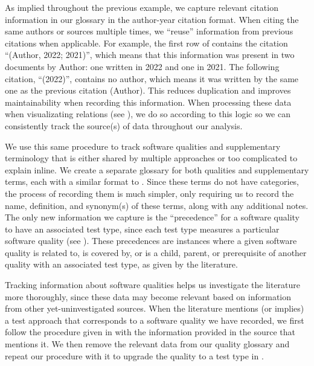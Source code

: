 \ifnotpaper
    \label{record-cites}
    As implied throughout the previous example, we capture relevant citation
    information in our glossary in the author-year citation format. When citing
    the same authors or sources multiple times, we ``reuse'' information from
    previous citations
    when applicable. For example, the first row of 
    contains the citation ``(Author, 2022; 2021)'', which means that this
    information was present in two documents by Author: one written in
    2022 and one in 2021. The following citation, ``(2022)'', contains no author,
    which means it was written by the same one as the previous citation (Author).
    This reduces duplication and improves maintainability when recording this
    information. When processing these data when visualizating relations
    (see ), we do so according to this
    logic  so we can
    consistently track the source(s) of data throughout our analysis.
\fi

\label{qual-supp-procedure}
We use this same procedure to track software qualities and supplementary
terminology that is either shared by multiple approaches or too complicated to
explain inline. We create a separate glossary for both qualities and
supplementary terms, each with a similar format to \ourApproachGlossary.
Since these terms do not have categories, the process of recording them is much
simpler, only requiring us to record the name, definition, and synonym(s) of
these terms, along with any additional notes. The only new information
we capture is the ``precedence'' for a software quality to have an associated
test type, since each test type measures a particular software quality (see
). These precedences are instances where a given software
quality is related to, is covered by, or is a child, parent, or prerequisite
of another quality with an associated test type, as given by the literature.

Tracking information about software qualities helps us investigate the
literature more thoroughly, since these data may become relevant based on
information from other yet-uninvestigated sources. When the literature mentions
(or implies) a test approach that corresponds to a software quality we have
recorded, we first follow the procedure given in 
with the information provided in the source that mentions it. We then remove
the relevant data from our quality glossary and repeat our procedure with it
to upgrade the quality to a test type in \ourApproachGlossary{}.

